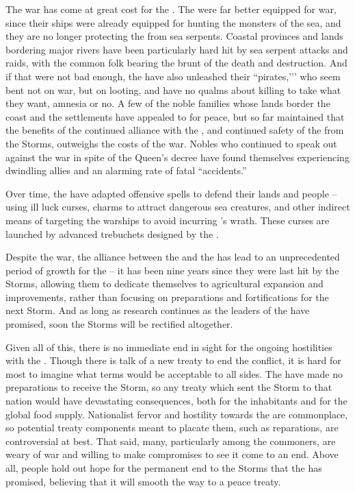 \documentclass[blue]{GL2020}
\begin{document}
The war has come at great cost for the \pFarm{}. The \pShippies{} were far better equipped for war, since their ships were already equipped for hunting the monsters of the sea, and they are no longer protecting the \pFarm{} from sea serpents.  Coastal provinces and lands bordering major rivers have been particularly hard hit by sea serpent attacks and \pShip{} raids, with the common folk bearing the brunt of the death and destruction.  And if that were not bad enough, the \pShip{} have also unleashed their ``pirates,’’’ who seem bent not on war, but on looting, and have no qualms about killing to take what they want, amnesia or no.  A few of the noble families whose lands border the coast and the \pShip{} settlements have appealed to \cQueen{\Majesty} \cQueen{} for peace, but so far \cQueen{\they} \cQueen{\has} maintained that the benefits of the continued alliance with the \pTechies{}, and continued safety of the \pFarm{} from the Storms, outweighs the costs of the war.  Nobles who continued to speak out against the war in spite of the Queen’s decree have found themselves experiencing dwindling allies and an alarming rate of fatal ``accidents.'' 

Over time, the \pFarm{} have adapted offensive spells to defend their lands and people – using ill luck curses, charms to attract dangerous sea creatures, and other indirect means of targeting the warships to avoid incurring \cFarmGod{}’s wrath.  These curses are launched by advanced trebuchets designed by the \pTech{}.

Despite the war, the alliance between the \pFarm{} and the \pTech{} has lead to an unprecedented period of growth for the \pFarmers{} -- it has been nine years since they were last hit by the Storms, allowing them to dedicate themselves to agricultural expansion and improvements, rather than focusing on preparations and fortifications for the next Storm.  And as long as research continues as the leaders of the \pTech{} have promised, soon the Storms will be rectified altogether.  

Given all of this, there is no immediate end in sight for the ongoing hostilities with the \pShip{}.  Though there is talk of a new treaty to end the conflict, it is hard for most to imagine what terms would be acceptable to all sides.  The \pFarm{} have made no preparations to receive the Storm, so any treaty which sent the Storm to that nation would have devastating consequences, both for the inhabitants and for the global food supply.  Nationalist fervor and hostility towards the \pShippies{} are commonplace, so potential treaty components meant to placate them, such as reparations, are controversial at best.  That said, many, particularly among the commoners, are weary of war and willing to make compromises to see it come to an end.  Above all, people hold out hope for the permanent end to the Storms that the \pTech{} has promised, believing that it will smooth the way to a peace treaty.
\end{document}
